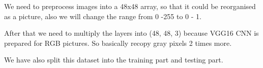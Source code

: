 We need to preprocess images into a 48x48 array, so that it could be reorganised as a picture, also we will change the range from 0 -255 to 0 - 1.

After that we need to multiply the layers into (48, 48, 3) because VGG16 CNN is prepared for RGB pictures. So basically recopy gray pixels 2 times more.

We have also split this dataset into the training part and testing part.

